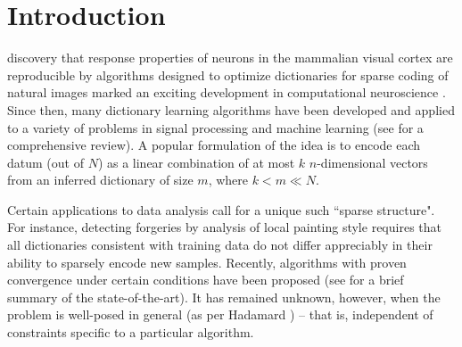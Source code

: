 \documentclass[journal, twocolumn]{IEEEtran}
\begin{document}
\section{Introduction}\label{Intro}
 discovery that response properties of neurons in the mammalian visual cortex are reproducible by algorithms designed to optimize dictionaries for sparse coding of natural images marked an exciting development in computational neuroscience \cite{Olshausen96, hurri1996image, bell1997independent, van1998independent}. Since then, many dictionary learning algorithms have been developed and applied to a variety of problems in signal processing and machine learning (see \cite{Zhang15} for a comprehensive review). A popular formulation of the idea is to encode each datum (out of $N$) as a linear combination of at most $k$ $n$-dimensional vectors from an inferred dictionary of size $m$, where $k < m \ll N$. 

Certain applications to data analysis call for a unique such ``sparse structure". For instance, detecting forgeries by analysis of local painting style \cite{hughes2010, Olshausen10} requires that all dictionaries consistent with training data do not differ appreciably in their ability to sparsely encode new samples. Recently, algorithms with proven convergence under certain conditions have been proposed  (see \cite[Sec.~I-E]{Sun16} for a brief summary of the state-of-the-art). It has remained unknown, however, when the problem is well-posed in general (as per Hadamard \cite{Hadamard1902}) -- that is, independent of constraints specific to a particular algorithm.
\end{document}
